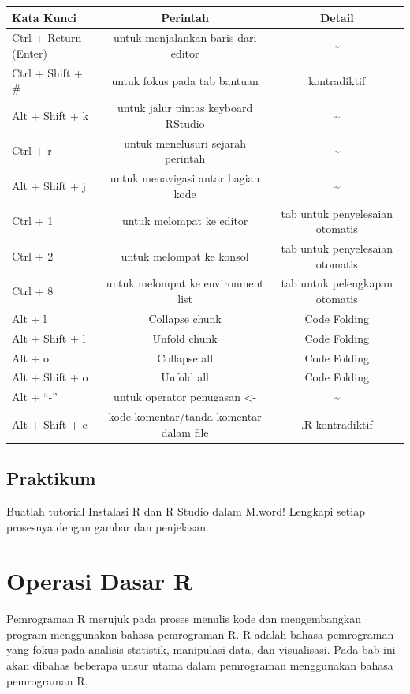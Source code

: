 \documentclass[
]{book}
\begin{document}
\begin{longtable}[]{@{}lcc@{}}
\toprule\noalign{}
Kata Kunci & Perintah & Detail \\
\midrule\noalign{}
\endhead
\bottomrule\noalign{}
\endlastfoot
Ctrl + Return (Enter) & untuk menjalankan baris dari editor & \textasciitilde{} \\
Ctrl + Shift + \# & untuk fokus pada tab bantuan & kontradiktif \\
Alt + Shift + k & untuk jalur pintas keyboard RStudio & \textasciitilde{} \\
Ctrl + r & untuk menelusuri sejarah perintah & \textasciitilde{} \\
Alt + Shift + j & untuk menavigasi antar bagian kode & \textasciitilde{} \\
Ctrl + 1 & untuk melompat ke editor & tab untuk penyelesaian otomatis \\
Ctrl + 2 & untuk melompat ke konsol & tab untuk penyelesaian otomatis \\
Ctrl + 8 & untuk melompat ke environment list & tab untuk pelengkapan otomatis \\
Alt + l & Collapse chunk & Code Folding \\
Alt + Shift + l & Unfold chunk & Code Folding \\
Alt + o & Collapse all & Code Folding \\
Alt + Shift + o & Unfold all & Code Folding \\
Alt + ``-'' & untuk operator penugasan \textless- & \textasciitilde{} \\
Alt + Shift + c & kode komentar/tanda komentar dalam file & .R kontradiktif \\
\end{longtable}

\hypertarget{praktikum}{%
\section{Praktikum}\label{praktikum}}

Buatlah tutorial Instalasi R dan R Studio dalam M.word! Lengkapi setiap prosesnya dengan gambar dan penjelasan.

\hypertarget{operasi-dasar-r}{%
\chapter{Operasi Dasar R}\label{operasi-dasar-r}}

Pemrograman R merujuk pada proses menulis kode dan mengembangkan program menggunakan bahasa pemrograman R. R adalah bahasa pemrograman yang fokus pada analisis statistik, manipulasi data, dan visualisasi. Pada bab ini akan dibahas beberapa unsur utama dalam pemrograman menggunakan bahasa pemrograman R.
\end{document}
